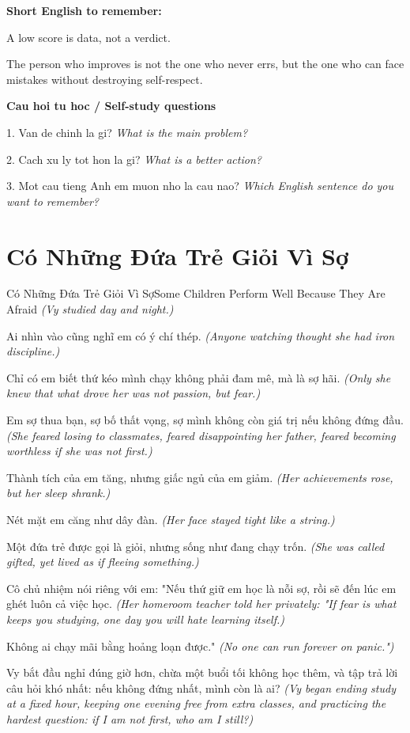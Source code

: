 \begin{ghinhoanh}
\textbf{Short English to remember:}

A low score is data, not a verdict.

The person who improves is not the one who never errs, but the one who can face mistakes without destroying self-respect.

\end{ghinhoanh}

\begin{tuhocnhanh}
\textbf{Cau hoi tu hoc / Self-study questions}

1. Van de chinh la gi? \textit{What is the main problem?}

2. Cach xu ly tot hon la gi? \textit{What is a better action?}

3. Mot cau tieng Anh em muon nho la cau nao? \textit{Which English sentence do you want to remember?}
\end{tuhocnhanh}
\ngancach

\section{Có Những Đứa Trẻ Giỏi Vì Sợ}
\begin{truyen}{Có Những Đứa Trẻ Giỏi Vì Sợ}{Some Children Perform Well Because They Are Afraid}
\textit{(Vy studied day and night.)}

Ai nhìn vào cũng nghĩ em có ý chí thép.
\textit{(Anyone watching thought she had iron discipline.)}

Chỉ có em biết thứ kéo mình chạy không phải đam mê, mà là sợ hãi.
\textit{(Only she knew that what drove her was not passion, but fear.)}

Em sợ thua bạn, sợ bố thất vọng, sợ mình không còn giá trị nếu không đứng đầu.
\textit{(She feared losing to classmates, feared disappointing her father, feared becoming worthless if she was not first.)}

Thành tích của em tăng, nhưng giấc ngủ của em giảm.
\textit{(Her achievements rose, but her sleep shrank.)}

Nét mặt em căng như dây đàn.
\textit{(Her face stayed tight like a string.)}

Một đứa trẻ được gọi là giỏi, nhưng sống như đang chạy trốn.
\textit{(She was called gifted, yet lived as if fleeing something.)}

Cô chủ nhiệm nói riêng với em: "Nếu thứ giữ em học là nỗi sợ, rồi sẽ đến lúc em ghét luôn cả việc học.
\textit{(Her homeroom teacher told her privately: "If fear is what keeps you studying, one day you will hate learning itself.)}

Không ai chạy mãi bằng hoảng loạn được."
\textit{(No one can run forever on panic.")}

Vy bắt đầu nghỉ đúng giờ hơn, chừa một buổi tối không học thêm, và tập trả lời câu hỏi khó nhất: nếu không đứng nhất, mình còn là ai?
\textit{(Vy began ending study at a fixed hour, keeping one evening free from extra classes, and practicing the hardest question: if I am not first, who am I still?)}

\end{truyen}

